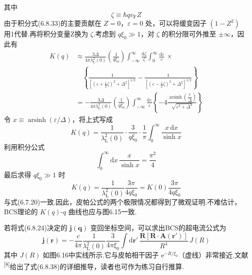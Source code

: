 其中
\begin{equation}
  \zeta\equiv\hbar qv_{\mathrm{F}}Z
\end{equation}
由于积分式(6.8.33)的主要贡献在 $Z=0$，$\varepsilon=0$ 处，可以将缓变因子 $\left(1-Z^{2}\right)$ 用1代替.再将积分变量Z换为 $\zeta$.考虑到 $q\xi_{0}\gg1$，对 $\zeta$ 的积分限可外推至 $\pm\infty$，因此有
\begin{equation}
\begin{aligned}
  K(q)&\approx\frac{3\Delta}{4\pi\lambda_{\mathrm{L}}^{2}(0)}
  \left(\frac{1}{q\xi_{0}}\right)\int_{-\infty}^{\infty}\frac{\mathrm{d}\zeta}{\zeta}
  \int_{0}^{\infty}\frac{\mathrm{d}\varepsilon}{\varepsilon}\,\times\\
  &\quad\left\{\frac{1}{\left[\left(\varepsilon+\frac{1}{2}\zeta\right)^{2}
  +\Delta^{2}\right]^{1/2}}
  -\frac{1}{\left[\left(\varepsilon-\frac{1}{2}\zeta\right)^{2}
  +\Delta^{2}\right]^{1/2}}\right\}\\
  &=-\frac{3\Delta}{4\pi\lambda_{\mathrm{L}}^{2}(0)}
  \left(\frac{1}{q\xi_{0}}\right)\int_{-\infty}^{\infty}
  \frac{\mathrm{d}\varepsilon}{\varepsilon}
  \left\{-4\frac{\operatorname{arsinh}\left(\dfrac{\varepsilon}{\Delta}\right)}
  {\sqrt{\varepsilon^{2}+\Delta^{2}}}\right\}
\end{aligned}
\end{equation}
令 $x\equiv\operatorname{arsinh}\left(\varepsilon/\Delta\right)$，将上式写成
\begin{equation}
  K(q)=\frac{1}{\lambda_{\mathrm{L}}^{2}(0)}\cdot\frac{3}{q\xi_{0}}
  \cdot\frac{1}{\pi}\int_{0}^{\infty}\frac{x\,\mathrm{d}x}{\sinh x}
\end{equation}
利用积分公式
\begin{equation*}
  \int_{0}^{\infty}\mathrm{d}x\,\frac{x}{\sinh x}=\frac{\pi^{2}}{4}
\end{equation*}
最后求得 $q\xi_{0}\gg1$ 时
\begin{equation}
  K(q)=\frac{1}{\lambda_{\mathrm{L}}^{2}(0)}\frac{3\pi}{4q\xi_{0}}
  =K(0)\frac{3\pi}{4q\xi_{0}}
\end{equation}
与式(6.7.20)一致.因此，皮帕公式的两个极限情况都得到了微观证明.不难估计，BCS理论的 $K(q)$-$q$ 曲线也应与图6.15一致.

若将式(6.8.24)决定的 $\boldsymbol{j}(\boldsymbol{q})$ 变回坐标空间，可以求出BCS的超电流公式为
\begin{equation}
  \boldsymbol{j}(\boldsymbol{r})
  =-\frac{c}{4\pi}\frac{1}{\lambda_{\mathrm{L}}^{2}(0)}
  \frac{3}{4\pi\xi_{0}}
  \int\mathrm{d}\boldsymbol{r}'\,
  \frac{\boldsymbol{R}\left[\boldsymbol{R}\cdot\boldsymbol{A}(\boldsymbol{r}')\right]}{R^{4}}\,
  J(R)
\end{equation}
其中 $J(R)$ 如图6.16中实线所示.它与皮帕相干因子 $\mathrm{e}^{-R/\xi_{0}}$（虚线）非常接近.文献\textsuperscript{[8]}给出了式(6.8.38)的详细推导，读者也可作为练习自行推算.

